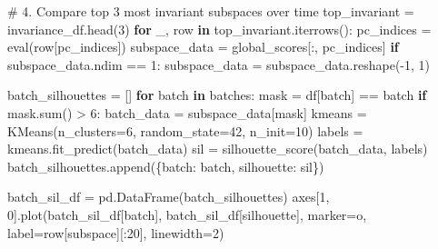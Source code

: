 \documentclass[
  letterpaper,
  DIV=11,
  numbers=noendperiod]{scrartcl}
\newenvironment{Shaded}{\begin{snugshade}}{\end{snugshade}}
\newcommand{\BuiltInTok}[1]{\textcolor[rgb]{0.00,0.23,0.31}{#1}}
\newcommand{\CommentTok}[1]{\textcolor[rgb]{0.37,0.37,0.37}{#1}}
\newcommand{\ControlFlowTok}[1]{\textcolor[rgb]{0.00,0.23,0.31}{\textbf{#1}}}
\newcommand{\DecValTok}[1]{\textcolor[rgb]{0.68,0.00,0.00}{#1}}
\newcommand{\KeywordTok}[1]{\textcolor[rgb]{0.00,0.23,0.31}{\textbf{#1}}}
\newcommand{\NormalTok}[1]{\textcolor[rgb]{0.00,0.23,0.31}{#1}}
\newcommand{\OperatorTok}[1]{\textcolor[rgb]{0.37,0.37,0.37}{#1}}
\newcommand{\StringTok}[1]{\textcolor[rgb]{0.13,0.47,0.30}{#1}}
\renewenvironment{Shaded}{%
  \begin{tcolorbox}[%
    enhanced,%
    colback=codebg,%
    colframe=codebg,%
    borderline west={3pt}{0pt}{sectionblue},%
    fontupper=\small\ttfamily,%
    boxrule=0pt,%
    arc=0pt,%
    boxsep=5pt,%
    left=2mm,%
    right=2mm,%
    top=2mm,%
    bottom=2mm%
  ]%
}{%
  \end{tcolorbox}%
}
\begin{document}
\begin{Shaded}
\begin{Highlighting}[]
\CommentTok{\# 4. Compare top 3 most invariant subspaces over time}
\NormalTok{top\_invariant }\OperatorTok{=}\NormalTok{ invariance\_df.head(}\DecValTok{3}\NormalTok{)}
\ControlFlowTok{for}\NormalTok{ \_, row }\KeywordTok{in}\NormalTok{ top\_invariant.iterrows():}
\NormalTok{    pc\_indices }\OperatorTok{=} \BuiltInTok{eval}\NormalTok{(row[}\StringTok{\textquotesingle{}pc\_indices\textquotesingle{}}\NormalTok{])}
\NormalTok{    subspace\_data }\OperatorTok{=}\NormalTok{ global\_scores[:, pc\_indices]}
    \ControlFlowTok{if}\NormalTok{ subspace\_data.ndim }\OperatorTok{==} \DecValTok{1}\NormalTok{:}
\NormalTok{        subspace\_data }\OperatorTok{=}\NormalTok{ subspace\_data.reshape(}\OperatorTok{{-}}\DecValTok{1}\NormalTok{, }\DecValTok{1}\NormalTok{)}
    
\NormalTok{    batch\_silhouettes }\OperatorTok{=}\NormalTok{ []}
    \ControlFlowTok{for}\NormalTok{ batch }\KeywordTok{in}\NormalTok{ batches:}
\NormalTok{        mask }\OperatorTok{=}\NormalTok{ df[}\StringTok{\textquotesingle{}batch\textquotesingle{}}\NormalTok{] }\OperatorTok{==}\NormalTok{ batch}
        \ControlFlowTok{if}\NormalTok{ mask.}\BuiltInTok{sum}\NormalTok{() }\OperatorTok{\textgreater{}} \DecValTok{6}\NormalTok{:}
\NormalTok{            batch\_data }\OperatorTok{=}\NormalTok{ subspace\_data[mask]}
\NormalTok{            kmeans }\OperatorTok{=}\NormalTok{ KMeans(n\_clusters}\OperatorTok{=}\DecValTok{6}\NormalTok{, random\_state}\OperatorTok{=}\DecValTok{42}\NormalTok{, n\_init}\OperatorTok{=}\DecValTok{10}\NormalTok{)}
\NormalTok{            labels }\OperatorTok{=}\NormalTok{ kmeans.fit\_predict(batch\_data)}
\NormalTok{            sil }\OperatorTok{=}\NormalTok{ silhouette\_score(batch\_data, labels)}
\NormalTok{            batch\_silhouettes.append(\{}\StringTok{\textquotesingle{}batch\textquotesingle{}}\NormalTok{: batch, }\StringTok{\textquotesingle{}silhouette\textquotesingle{}}\NormalTok{: sil\})}
    
\NormalTok{    batch\_sil\_df }\OperatorTok{=}\NormalTok{ pd.DataFrame(batch\_silhouettes)}
\NormalTok{    axes[}\DecValTok{1}\NormalTok{, }\DecValTok{0}\NormalTok{].plot(batch\_sil\_df[}\StringTok{\textquotesingle{}batch\textquotesingle{}}\NormalTok{], batch\_sil\_df[}\StringTok{\textquotesingle{}silhouette\textquotesingle{}}\NormalTok{], }
\NormalTok{                   marker}\OperatorTok{=}\StringTok{\textquotesingle{}o\textquotesingle{}}\NormalTok{, label}\OperatorTok{=}\NormalTok{row[}\StringTok{\textquotesingle{}subspace\textquotesingle{}}\NormalTok{][:}\DecValTok{20}\NormalTok{], linewidth}\OperatorTok{=}\DecValTok{2}\NormalTok{)}


\end{Highlighting}
\end{Shaded}
\end{document}
